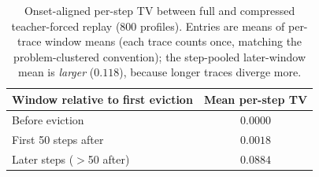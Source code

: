\documentclass{article}
\begin{document}
\begin{table}[t]
\centering
\caption{Onset-aligned per-step TV between full and compressed teacher-forced replay (800 profiles). Entries are means of per-trace window means (each trace counts once, matching the problem-clustered convention); the step-pooled later-window mean is \emph{larger} ($0.118$), because longer traces diverge more.}
\label{tab:tv}
\begin{tabular}{lc}
\toprule
Window relative to first eviction & Mean per-step TV \\
\midrule
Before eviction & $\mathbf{0.0000}$ \\
First 50 steps after & $0.0018$ \\
Later steps ($>$50 after) & $\mathbf{0.0884}$ \\
\bottomrule
\end{tabular}
\end{table}
\end{document}
